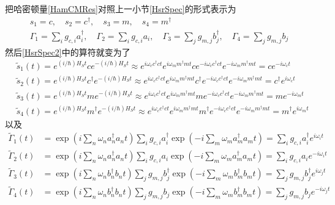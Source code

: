 把哈密顿量\eqref{HamCMRes}对照上一小节\eqref{HsrSpec}的形式表示为
\begin{equation}
\begin{gathered}
s_{1}=c, \quad s_{2}=c^{\dagger}, \quad s_{3}=m, \quad s_{4}=m^{\dagger} \\
\Gamma_{1}= \sum_{i} g_{c,i} a_{i}^{\dag}, \quad \Gamma_{2}= \sum_{i} g_{c,i} a_{i}, \quad \Gamma_{3}= \sum_{j} g_{m,j} b_{j}^{\dag}, \quad \Gamma_{4}= \sum_{j} g_{m,j} b_{j}
\end{gathered}
\end{equation}
然后\eqref{HsrSpec2}中的算符就变为了
\begin{equation}
\begin{aligned}
&\tilde{s}_{1}(t)=e^{(i / \hbar) H_{S} t} c e^{-(i / \hbar) H_{S} t} \approx e^{i \omega_{c}c^{\dag}c t} e^{i \omega_{m}m^{\dag}m t} c e^{-i \omega_{c}c^{\dag}c t} e^{-i \omega_{m}m^{\dag}m t} = c e^{-i \omega_{c} t} \\
&\tilde{s}_{2}(t)=e^{(i / \hbar) H_{S} t} c^{\dagger} e^{-(i / \hbar) H_{S} t} \approx e^{i \omega_{c}c^{\dag}c t} e^{i \omega_{m}m^{\dag}m t} c^{\dagger} e^{-i \omega_{c}c^{\dag}c t} e^{-i \omega_{m}m^{\dag}m t} = c^{\dagger} e^{i \omega_{c} t} \\
&\tilde{s}_{3}(t)=e^{(i / \hbar) H_{S} t} m e^{-(i / \hbar) H_{S} t} \approx e^{i \omega_{c}c^{\dag}c t} e^{i \omega_{m}m^{\dag}m t} m e^{-i \omega_{c}c^{\dag}c t} e^{-i \omega_{m}m^{\dag}m t} = m e^{-i \omega_{m} t} \\
&\tilde{s}_{4}(t)=e^{(i / \hbar) H_{S} t} m^{\dagger} e^{-(i / \hbar) H_{S} t} \approx e^{i \omega_{c}c^{\dag}c t} e^{i \omega_{m}m^{\dag}m t} m^{\dagger} e^{-i \omega_{c}c^{\dag}c t} e^{-i \omega_{m}m^{\dag}m t} =m^{\dagger} e^{i \omega_{m} t}
\label{interactS}
\end{aligned}
\end{equation}
以及
\begin{equation}
\begin{aligned}
\tilde{\Gamma}_{1}(t) &=\exp \left(i \sum_{n}\omega_{n}a_{n}^{\dag}a_{n} t\right) \sum_{i} g_{c,i} a_{i}^{\dag} \exp \left(-i \sum_{m}\omega_{m}a_{m}^{\dag}a_{m} t\right) =\sum_{i} g_{c,i} a_{i}^{\dag} e^{i \omega_{i} t} \\
\tilde{\Gamma}_{2}(t) &=\exp \left(i \sum_{n}\omega_{n}a_{n}^{\dag}a_{n} t\right) \sum_{i} g_{c,i} a_{i} \exp \left(-i \sum_{m}\omega_{m}a_{m}^{\dag}a_{m} t\right) =\sum_{i} g_{c,i} a_{i} e^{-i \omega_{i} t} \\
\tilde{\Gamma}_{3}(t) &=\exp \left(i \sum_{n}\omega_{n}b_{n}^{\dag}b_{n} t\right) \sum_{j} g_{m,j} b_{j}^{\dag} \exp \left(-i \sum_{m}\omega_{m}b_{m}^{\dag}b_{m} t\right) =\sum_{j} g_{m,j} b_{j}^{\dag} e^{i \omega_{j} t} \\
\tilde{\Gamma}_{4}(t) &=\exp \left(i \sum_{n}\omega_{n}b_{n}^{\dag}b_{n} t\right) \sum_{j} g_{m,j} b_{j} \exp \left(-i \sum_{m}\omega_{m}b_{m}^{\dag}b_{m} t\right) =\sum_{j} g_{m,j} b_{j} e^{-i \omega_{j} t}
\label{interactGam}
\end{aligned}
\end{equation}
